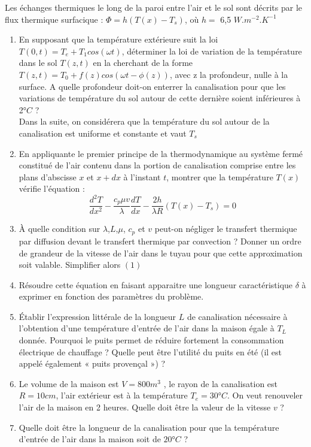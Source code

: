 \documentclass{article}
\begin{document}
\begin{enumerate}
Les échanges thermiques le long de la paroi entre l’air et le sol sont décrits par le flux thermique surfacique : $\Phi = h(T(x)-T_s)$, où $h=$ 6,5 $W.m^{-2}.K^{-1}$
\begin{enumerate}
    \item En supposant que la température extérieure suit la loi $T(0,t) = T_e + T_1 cos(\omega t)$, déterminer la loi de variation de la température dans le sol $T(z,t)$ en la cherchant de la forme $T(z,t) = T_0 + f(z)cos(\omega t - \phi(z))$, avec z la profondeur, nulle à la surface. A quelle profondeur doit-on enterrer la canalisation pour que les variations de température du sol autour de cette dernière soient inférieures à 2°$C$ ? 
    \\
    Dans la suite, on considérera  que la température du sol autour de la canalisation est uniforme et constante et vaut $T_s$
    \item En appliquante le premier principe de la thermodynamique au système fermé constitué de l'air contenu dans la portion de canalisation comprise entre les plans d'abscisse $x$ et $x+dx$ à l'instant $t$, montrer que la température $T(x)$ vérifie l'équation : 
    \begin{equation}
        \frac{d^2T}{dx^2} - \frac{c_p \mu v}{\lambda} \frac{dT}{dx} - \frac{2h}{\lambda R} (T(x)-T_s)=0
    \end{equation}
    \item À quelle condition sur $\lambda$,$L$,$\mu$, $c_p$ et $v$ peut-on  négliger le transfert thermique par diffusion devant le transfert thermique par convection  ? Donner un ordre de grandeur de la vitesse de l'air dans le tuyau pour que cette approximation soit valable. Simplifier alors $(1)$
    \item Résoudre cette équation en faisant apparaitre une longueur caractéristique $\delta$ à exprimer en
fonction des paramètres du problème. 
\item  Établir l’expression littérale de la longueur $L $ de canalisation nécessaire à l’obtention d’une
température d’entrée de l’air dans la maison égale à $T_L$ donnée. Pourquoi le puits permet de
réduire fortement la consommation électrique de chauffage ? Quelle peut être l’utilité du puits
en été (il est appelé également « puits provençal ») ? 
\item  Le volume de la maison est $V = 800 m^3$ , le rayon de la canalisation est $R = 10 cm$, l'air
extérieur est à la température $T_e = 30$°$C$. On veut renouveler l’air de la maison en 2 heures.
Quelle doit être la valeur de la vitesse $ v$ ? 
\item Quelle doit être la longueur de la canalisation pour que la température d’entrée de l’air
dans la maison soit de $20$°$C $ ? 
\end{enumerate}

\end{enumerate}
\end{document}
